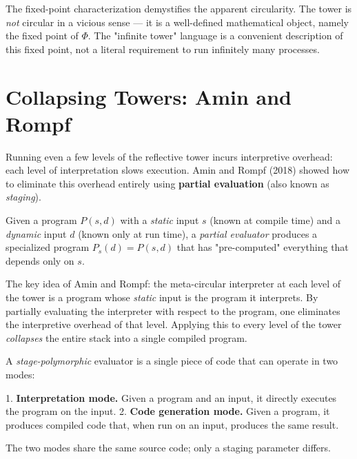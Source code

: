 \begin{remark}
The fixed-point characterization demystifies the apparent circularity. The tower is \textit{not} circular in a vicious sense --- it is a well-defined mathematical object, namely the fixed point of $\Phi$. The "infinite tower" language is a convenient description of this fixed point, not a literal requirement to run infinitely many processes.
\end{remark}

\section{Collapsing Towers: Amin and Rompf}

Running even a few levels of the reflective tower incurs interpretive overhead: each level of interpretation slows execution. Amin and Rompf (2018) showed how to eliminate this overhead entirely using \textbf{partial evaluation} (also known as \textit{staging}).

\begin{definition}
Given a program $P(s, d)$ with a \textit{static} input $s$ (known at compile time) and a \textit{dynamic} input $d$ (known only at run time), a \textit{partial evaluator} produces a specialized program $P_s(d) = P(s, d)$ that has "pre-computed" everything that depends only on $s$.

The key idea of Amin and Rompf: the meta-circular interpreter at each level of the tower is a program whose \textit{static} input is the program it interprets. By partially evaluating the interpreter with respect to the program, one eliminates the interpretive overhead of that level. Applying this to every level of the tower \textit{collapses} the entire stack into a single compiled program.
\end{definition}

\begin{definition}
A \textit{stage-polymorphic} evaluator is a single piece of code that can operate in two modes:

1. \textbf{Interpretation mode.} Given a program and an input, it directly executes the program on the input.
2. \textbf{Code generation mode.} Given a program, it produces compiled code that, when run on an input, produces the same result.

The two modes share the same source code; only a staging parameter differs.
\end{definition}

